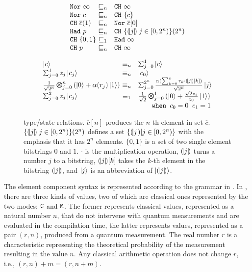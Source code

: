 \begin{figure}
{\small
{\hspace*{-6em}
\begin{minipage}[t]{0.4\textwidth}
\begin{center}
 \[
  \begin{array}{l@{~}cl}
  \tnor{\infty} &\sqsubseteq_n& \tch{\infty}\\
  \tnor{c} &\sqsubseteq_n& \tch{\{c\}}\\
  \tch{\overline{c}(1)} &\sqsubseteq_n& \tnor{\overline{c}[0]}\\
  \thad{p} &\sqsubseteq_n& \tch{\{\tos{j}|j\in[0,2^n)\}(2^n)}\\
  \tch{\{0,1\}} &\sqsubseteq_1& \thad{\infty}\\
  \tch{p} &\sqsubseteq_n& \tch{\infty}
    \end{array}
  \]
\end{center}
  \label{fig:qafny-subtype}
\end{minipage}
\qquad
\begin{minipage}[t]{0.45\textwidth}
\begin{center}
   \[
   \begin{array}{l@{~}cl}
  \ket{c} &\equiv_n& \sch{1}{ }{c}\\
  \sch{1}{z_j}{c_j} &\equiv_n& \ket{c_0}\\
  \shad{2^n}{n}{\alpha(r_j)} &\equiv_n& \sch{2^n}{\frac{\alpha(\sum_{k=0}^{n} r_k \cdot \tos{j}[k])}{\sqrt{2^n}}}{j}\\
  \sch{2}{z_j}{c_j} &\equiv_1& \shad{2}{1}{\frac{\sqrt{2}z_1}{z_0}}\\
   &&\qquad\texttt{when }c_0=0\;\;c_1=1
    \end{array}
 \]
\end{center}
  \label{fig:qafny-sequiv}
\end{minipage}
  \caption{\qafny type/state relations. $\overline{c}[n]$ produces the $n$-th element in set $\overline{c}$. $\{(\!| j |\!)|j\in[0,2^n)\}(2^n)$ defines a set $\{(\!| j |\!)|j\in[0,2^n)\}$ with the emphasis that it has $2^n$ elements. $\{0,1\}$ is a set of two single element bitstrings $0$ and $1$. $\cdot$ is the multiplication operation, $(\!| j |\!)$ turns a number $j$ to a bitstring, $(\!| j |\!)[k]$ takes the $k$-th element in the bitstring $(\!| j |\!)$, and $\left\vert{j}\right\rangle$ is an abbreviation of $\left\vert{(\!| j |\!)}\right\rangle$.}
  \label{fig:qafny-eq}
}
}
\end{figure}

The \qafny element component syntax is represented according to the grammar in . 
In \qafny, there are three kinds of values, two of which are classical ones represented by the two modes: $\texttt{C}$ and $\texttt{M}$.
The former represents classical values, represented as a natural number $n$, that do not intervene with quantum measurements and are evaluated in the compilation time, the latter represents values, represented as a pair $(r,n)$, produced from a quantum measurement. The real number $r$ is a characteristic representing the theoretical probability of the measurement resulting in the value $n$.
Any classical arithmetic operation does not change $r$, i.e., $(r,n)+m=(r,n+m)$. 

